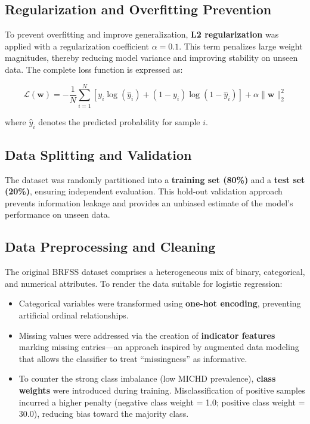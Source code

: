 \documentclass[twocolumn]{article}
\begin{document}
\subsection{Regularization and Overfitting Prevention}
To prevent overfitting and improve generalization, \textbf{L2 regularization} was applied with a regularization coefficient $\alpha = 0.1$. This term penalizes large weight magnitudes, thereby reducing model variance and improving stability on unseen data. The complete loss function is expressed as:

\begin{equation}
\mathcal{L}(\bm{w}) = -\frac{1}{N} \sum_{i=1}^{N} 
\left[ y_i \log(\hat{y}_i) + (1 - y_i) \log(1 - \hat{y}_i) \right]
+ \alpha \lVert \bm{w} \rVert_2^2
\end{equation}

where $\hat{y}_i$ denotes the predicted probability for sample $i$.

\subsection{Data Splitting and Validation}
The dataset was randomly partitioned into a \textbf{training set (80\%)} and a \textbf{test set (20\%)}, ensuring independent evaluation. This hold-out validation approach prevents information leakage and provides an unbiased estimate of the model’s performance on unseen data.

\subsection{Data Preprocessing and Cleaning}
The original BRFSS dataset comprises a heterogeneous mix of binary, categorical, and numerical attributes. To render the data suitable for logistic regression:
\begin{itemize}
    \item Categorical variables were transformed using \textbf{one-hot encoding}, preventing artificial ordinal relationships.
    \item Missing values were addressed via the creation of \textbf{indicator features} marking missing entries—an approach inspired by augmented data modeling that allows the classifier to treat “missingness” as informative.
    \item To counter the strong class imbalance (low MICHD prevalence), \textbf{class weights} were introduced during training. Misclassification of positive samples incurred a higher penalty (negative class weight = 1.0; positive class weight = 30.0), reducing bias toward the majority class.
\end{itemize}
\end{document}

